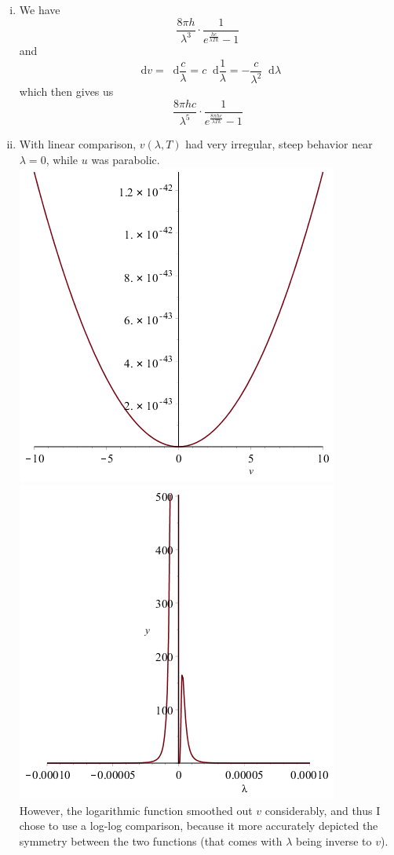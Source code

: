 \documentclass[11pt]{article} %
\newcommand*\diff{\mathop{}\!\mathrm{d}}
\begin{document}
\begin{enumerate}[i.)]
\item We have 
	$$\frac{8\pi h}{\lambda^3}\cdot\frac{1}{e^\frac{hc}{\lambda Tk} - 1}$$ 
and 
	$$\diff v = \diff \frac{c}{\lambda} = c \diff\frac{1}{\lambda} = -\frac{c}{\lambda^2} \diff \lambda$$
which then gives us
	$$\frac{8 \pi hc}{\lambda^5}\cdot\frac{1}{e^{\frac{8 \pi hc}{\lambda Tk}} -1}$$
\item With linear comparison, $v(\lambda,T)$ had very irregular, steep behavior near $\lambda = 0$, while $u$ was parabolic. \\
\includegraphics[scale=.5]{plots/problem10plot1000a.png}
\includegraphics[scale=.5]{plots/problem10plot1000b.png} \\
However, the logarithmic function smoothed out $v$ considerably, and thus I chose to use a log-log comparison, because it more accurately depicted the symmetry between the two functions (that comes with $\lambda$ being inverse to $v$).


\end{enumerate}
\end{document}
